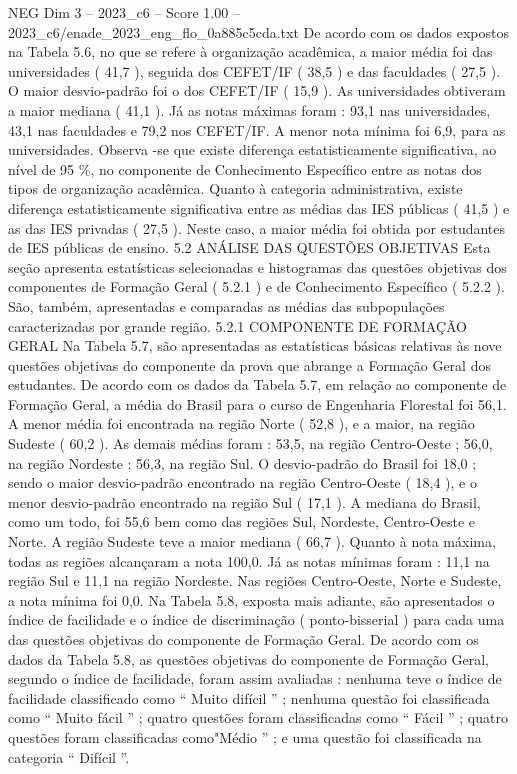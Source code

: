 \begin{textsample}{NEG Dim 3 – 2023\_c6 – Score 1.00 – 2023\_c6/enade\_2023\_eng\_flo\_0a885c5cda.txt}
De acordo com os dados expostos na Tabela 5.6, no que se refere à organização acadêmica, a maior média foi das universidades ( 41,7 ), seguida dos CEFET/IF ( 38,5 ) e das faculdades ( 27,5 ).
O maior desvio-padrão foi o dos CEFET/IF ( 15,9 ).
As universidades obtiveram a maior mediana ( 41,1 ).
Já as notas máximas foram : 93,1 nas universidades, 43,1 nas faculdades e 79,2 nos CEFET/IF.
A menor nota mínima foi 6,9, para as universidades.
Observa -se que existe diferença estatisticamente significativa, ao nível de 95 \%, no componente de Conhecimento Específico entre as notas dos tipos de organização acadêmica.
Quanto à categoria administrativa, existe diferença estatisticamente significativa entre as médias das IES públicas ( 41,5 ) e as das IES privadas ( 27,5 ).
Neste caso, a maior média foi obtida por estudantes de IES públicas de ensino. 5.2 ANÁLISE DAS QUESTÕES OBJETIVAS Esta seção apresenta estatísticas selecionadas e histogramas das questões objetivas dos componentes de Formação Geral ( 5.2.1 ) e de Conhecimento Específico ( 5.2.2 ).
São, também, apresentadas e comparadas as médias das subpopulações caracterizadas por grande região. 5.2.1 COMPONENTE DE FORMAÇÃO GERAL Na Tabela 5.7, são apresentadas as estatísticas básicas relativas às nove questões objetivas do componente da prova que abrange a Formação Geral dos estudantes.
De acordo com os dados da Tabela 5.7, em relação ao componente de Formação Geral, a média do Brasil para o curso de Engenharia Florestal foi 56,1.
A menor média foi encontrada na região Norte ( 52,8 ), e a maior, na região Sudeste ( 60,2 ).
As demais médias foram : 53,5, na região Centro-Oeste ; 56,0, na região Nordeste ; 56,3, na região Sul.
O desvio-padrão do Brasil foi 18,0 ; sendo o maior desvio-padrão encontrado na região Centro-Oeste ( 18,4 ), e o menor desvio-padrão encontrado na região Sul ( 17,1 ).
A mediana do Brasil, como um todo, foi 55,6 bem como das regiões Sul, Nordeste, Centro-Oeste e Norte.
A região Sudeste teve a maior mediana ( 66,7 ).
Quanto à nota máxima, todas as regiões alcançaram a nota 100,0.
Já as notas mínimas foram : 11,1 na região Sul e 11,1 na região Nordeste.
Nas regiões Centro-Oeste, Norte e Sudeste, a nota mínima foi 0,0.
Na Tabela 5.8, exposta mais adiante, são apresentados o índice de facilidade e o índice de discriminação ( ponto-bisserial ) para cada uma das questões objetivas do componente de Formação Geral.
De acordo com os dados da Tabela 5.8, as questões objetivas do componente de Formação Geral, segundo o índice de facilidade, foram assim avaliadas : nenhuma teve o índice de facilidade classificado como “ Muito difícil ” ; nenhuma questão foi classificada como “ Muito fácil ” ; quatro questões foram classificadas como “ Fácil ” ; quatro questões foram classificadas como"Médio ” ; e uma questão foi classificada na categoria “ Difícil ”.

\end{textsample}
